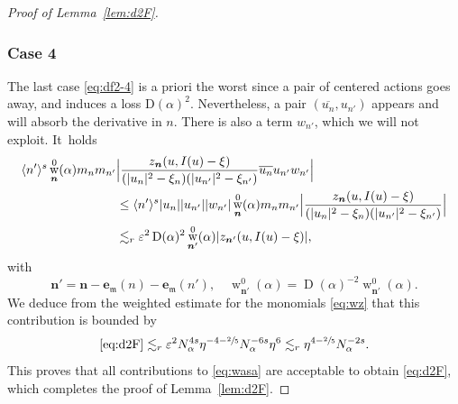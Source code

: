 \documentclass[JEP,XML,SOM,Unicode,published]{cedram}
\DeclareMathOperator{\rw}{w}
\theoremstyle{plain}
\theoremstyle{definition}
\newcommand{\nb}{{\boldsymbol n}}
\newcommand{\1}{\mathbf{1}}
\let\epsilon\varepsilon
\begin{document}
\begin{proof}[Proof of Lemma~\ref{lem:d2F}]
\subsubsection*{Case 4}
The last case \eqref{eq:df2-4} is a priori the worst since a pair of centered actions goes away, and induces a loss $\mathrm{D}(\alpha)^{2}$. Nevertheless, a pair $(\overline{u_{n}},u_{n'})$ appears and will absorb the derivative in $n$. There is also a term $w_{n'}$, which we will not exploit. It~holds
\begin{align*}
\langle n'\rangle^{s}
\rw_{\nb}^{0}(\alpha)
m_nm_{n'}
&\Bigl|
\frac{z_{\nb}(u,I(u)-\xi)}
{(|u_{n}|^{2}-\xi_{n})(|u_{n'}|^{2}-\xi_{n'})}
\overline{u_{n}}u_{n'}w_{n'}
\Bigr| \\
&\leq
\langle n'\rangle^{s}|u_{n}||u_{n'}||w_{n'}|
\rw_{\nb}^{0}(\alpha)
m_nm_{n'}
\Bigl|
\frac{z_{\nb}(u,I(u)-\xi)}
{(|u_{n}|^{2}-\xi_{n})(|u_{n'}|^{2}-\xi_{n'})}
\Bigr| \\
&\lesssim_{r}
\epsilon^{2}
\operatorname{D}(\alpha)^{2}
\rw_{\nb'}^{0}(\alpha)
|z_{\nb'}(u,I(u)-\xi)|,
\end{align*}
with
\[
\nb' = \nb - \boldsymbol{e}_{\mathfrak{m}}(n)-\boldsymbol{e}_{\mathfrak{m}}(n'),\quad
\rw^{0}_{\nb'}(\alpha)
=\operatorname{D}(\alpha)^{-2}\rw_{\nb'}^{0}(\alpha).
\]
We deduce from the weighted estimate for the monomials \eqref{eq:wz} that this contribution is bounded by
\[
\eqref{eq:d2F}\lesssim_{r}
\epsilon^{2}
N_{\alpha}^{4s}\eta^{-4-\sfrac{2}{5}}
N_{\alpha}^{-6s}\eta^{6}
\lesssim_{r}\eta^{4-\sfrac{2}{5}}N_{\alpha}^{-2s}.
\]
This proves that all contributions to \eqref{eq:wasa} are acceptable to obtain \eqref{eq:d2F}, which completes the proof of Lemma~\ref{lem:d2F}.
\end{proof}

\backmatter


\end{document}
